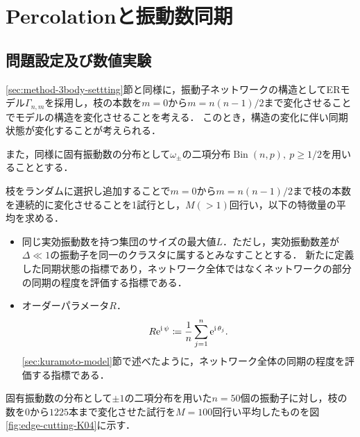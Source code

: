 \documentclass[../main]{subfiles}
\begin{document}
\chapter{Percolationと振動数同期}
\label{chap:percolation}
\section{問題設定及び数値実験}
\ref{sec:method-3body-settting}節と同様に，振動子ネットワークの構造としてERモデル$\Gamma_{n,m}$を採用し，枝の本数を$m=0$から$m=n(n-1)/2$まで変化させることでモデルの構造を変化させることを考える．
このとき，構造の変化に伴い同期状態が変化することが考えられる．

また，同様に固有振動数の分布として$\omega_\pm$の二項分布$\operatorname{Bin}(n,p),\ p\geq 1/2$を用いることとする．

枝をランダムに選択し追加することで$m=0$から$m=n(n-1)/2$まで枝の本数を連続的に変化させることを1試行とし，$M(>1)$回行い，以下の特徴量の平均を求める．
\begin{itemize}
    \item 
    同じ実効振動数を持つ集団のサイズの最大値$L$．ただし，実効振動数差が$\Delta\ll 1$の振動子を同一のクラスタに属するとみなすこととする．
    新たに定義した同期状態の指標であり，ネットワーク全体ではなくネットワークの部分の同期の程度を評価する指標である．
    \item
    オーダーパラメータ$R$．
    \begin{equation*}
        R\mathrm{e}^{{\mathrm i\,} \psi}\coloneqq\frac{1}{n}\sum_{j=1}^n\mathrm{e}^{{\mathrm i\,} \theta_j}.    
    \end{equation*}
    \ref{sec:kuramoto-model}節で述べたように，ネットワーク全体の同期の程度を評価する指標である．
\end{itemize}

固有振動数の分布として$\pm 1$の二項分布を用いた$n=50$個の振動子に対し，枝の数を$0$から$1225$本まで変化させた試行を$M=100$回行い平均したものを図\ref{fig:edge-cutting-K04}に示す．
\end{document}

